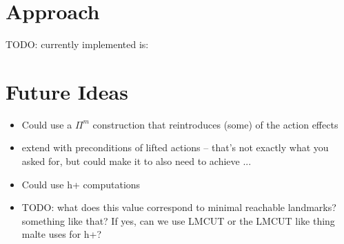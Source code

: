 \documentclass[twocolumn]{article}
\newcommand{\task}{\ensuremath{\Pi}\xspace}
\begin{document}
	\section{Approach}
	
	TODO: currently implemented is:
		
	\section{Future Ideas}
	
	\begin{itemize}
		\item Could use a $\task^{m}$ construction that reintroduces (some) of the action effects
		\item extend with preconditions of lifted actions -- that's not exactly what you asked for, but could make it to also need to achieve ... 
		\item Could use h+ computations
		\item 
		TODO: what does this value correspond to minimal reachable landmarks? something like that? If yes, can we use LMCUT or the LMCUT like thing malte uses for h+?
	\end{itemize}
	
	
\end{document}
